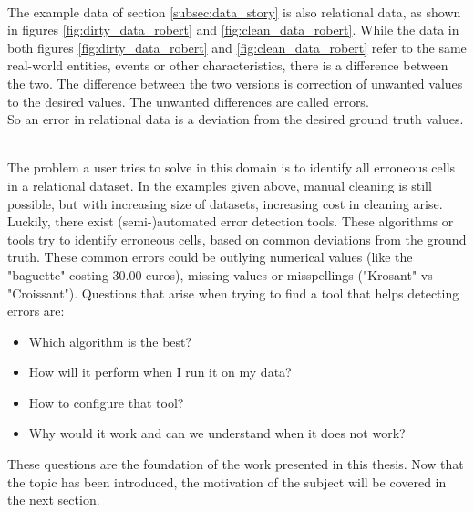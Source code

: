 ~\\The example data of section \ref{subsec:data_story} is also relational data, as shown in figures \ref{fig:dirty_data_robert} and \ref{fig:clean_data_robert}. While the data in both figures \ref{fig:dirty_data_robert} and \ref{fig:clean_data_robert} refer to the same real-world entities, events or other characteristics, there is a difference between the two. The difference between the two versions is correction of unwanted values to the desired values. The unwanted differences are called errors.
~\\So an error in relational data is a deviation from the desired ground truth values.

~\\The problem a user tries to solve in this domain is to identify all erroneous cells in a relational dataset. In the examples given above, manual cleaning is still possible, but with increasing size of datasets, increasing cost in cleaning arise. Luckily, there exist (semi-)automated error detection tools. These algorithms or tools try to identify erroneous cells, based on common deviations from the ground truth. These common errors could be outlying numerical values (like the "baguette" costing 30.00 euros), missing values or misspellings ("Krosant" vs "Croissant"). Questions that arise when trying to find a tool that helps detecting errors are:

\begin{itemize}
    \item Which algorithm is the best?
    \item How will it perform when I run it on my data?
    \item How to configure that tool?
    \item Why would it work and can we understand when it does not work?
\end{itemize}

These questions are the foundation of the work presented in this thesis. Now that the topic has been introduced, the motivation of the subject will be covered in the next section.